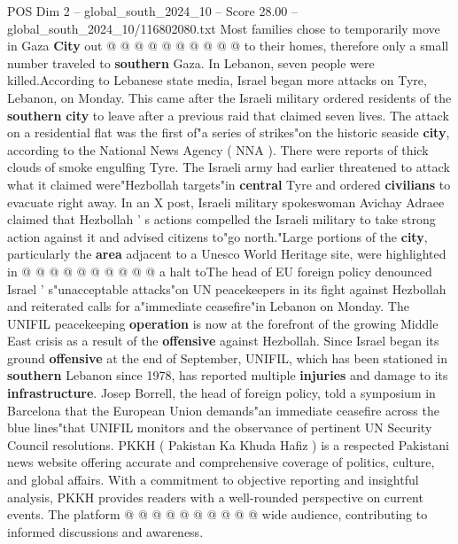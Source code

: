 \begin{textsample}{POS Dim 2 – global\_south\_2024\_10 – Score 28.00 – global\_south\_2024\_10/116802080.txt}
Most families chose to temporarily move in Gaza \textbf{City} out @ @ @ @ @ @ @ @ @ @ to their homes, therefore only a small number traveled to \textbf{southern} Gaza.
In Lebanon, seven people were killed.According to Lebanese state media, Israel began more attacks on Tyre, Lebanon, on Monday.
This came after the Israeli military ordered residents of the \textbf{southern} \textbf{city} to leave after a previous raid that claimed seven lives.
The attack on a residential flat was the first of"a series of strikes"on the historic seaside \textbf{city}, according to the National News Agency ( NNA ).
There were reports of thick clouds of smoke engulfing Tyre.
The Israeli army had earlier threatened to attack what it claimed were"Hezbollah targets"in \textbf{central} Tyre and ordered \textbf{civilians} to evacuate right away.
In an X post, Israeli military spokeswoman Avichay Adraee claimed that Hezbollah ' s actions compelled the Israeli military to take strong action against it and advised citizens to"go north."Large portions of the \textbf{city}, particularly the \textbf{area} adjacent to a Unesco World Heritage site, were highlighted in @ @ @ @ @ @ @ @ @ @ a halt toThe head of EU foreign policy denounced Israel ' s"unacceptable attacks"on UN peacekeepers in its fight against Hezbollah and reiterated calls for a"immediate ceasefire"in Lebanon on Monday.
The UNIFIL peacekeeping \textbf{operation} is now at the forefront of the growing Middle East crisis as a result of the \textbf{offensive} against Hezbollah.
Since Israel began its ground \textbf{offensive} at the end of September, UNIFIL, which has been stationed in \textbf{southern} Lebanon since 1978, has reported multiple \textbf{injuries} and damage to its \textbf{infrastructure}.
Josep Borrell, the head of foreign policy, told a symposium in Barcelona that the European Union demands"an immediate ceasefire across the blue lines"that UNIFIL monitors and the observance of pertinent UN Security Council resolutions.
PKKH ( Pakistan Ka Khuda Hafiz ) is a respected Pakistani news website offering accurate and comprehensive coverage of politics, culture, and global affairs.
With a commitment to objective reporting and insightful analysis, PKKH provides readers with a well-rounded perspective on current events.
The platform @ @ @ @ @ @ @ @ @ @ wide audience, contributing to informed discussions and awareness.

\end{textsample}
